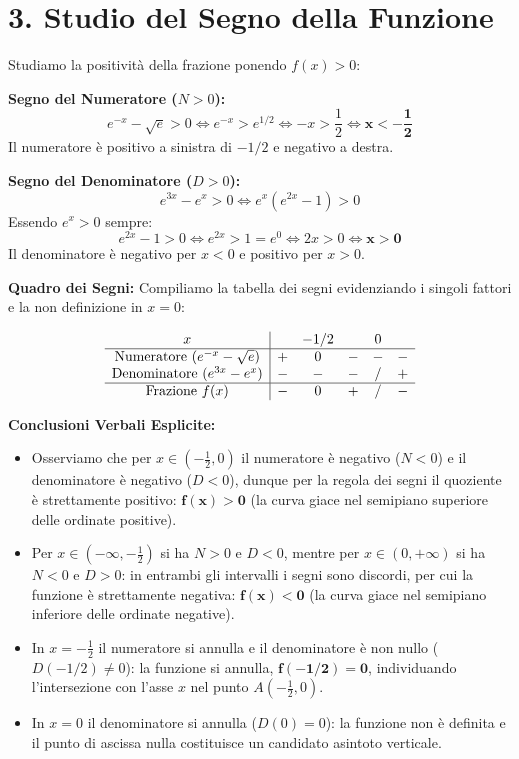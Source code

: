 \documentclass[11pt,a4paper,oneside]{report}
\begin{document}
\section{3. Studio del Segno della Funzione}
Studiamo la positività della frazione ponendo $f(x) > 0$:

\textbf{Segno del Numeratore ($N > 0$):}
\begin{equation*}
    e^{-x} - \sqrt{e} > 0 \iff e^{-x} > e^{1/2} \iff -x > \frac{1}{2} \iff \mathbf{x < -\frac{1}{2}}
\end{equation*}
Il numeratore è positivo a sinistra di $-1/2$ e negativo a destra.

\textbf{Segno del Denominatore ($D > 0$):}
\begin{equation*}
    e^{3x} - e^x > 0 \iff e^x(e^{2x} - 1) > 0
\end{equation*}
Essendo $e^x > 0$ sempre:
\begin{equation*}
    e^{2x} - 1 > 0 \iff e^{2x} > 1 = e^0 \iff 2x > 0 \iff \mathbf{x > 0}
\end{equation*}
Il denominatore è negativo per $x < 0$ e positivo per $x > 0$.

\textbf{Quadro dei Segni:}
Compiliamo la tabella dei segni evidenziando i singoli fattori e la non definizione in $x = 0$:

\[
\begin{array}{c|ccccc}
x & & -1/2 & & 0 & \\
\hline
\text{Numeratore } (e^{-x} - \sqrt{e}) & + & 0 & - & - & - \\
\text{Denominatore } (e^{3x} - e^x) & - & - & - & \text{\slash} & + \\
\hline
\text{Frazione } f(x) & - & 0 & + & \text{\slash} & - \\
\end{array}
\]

\textbf{Conclusioni Verbali Esplicite:}
\begin{itemize}[leftmargin=*, label=\textbullet]
    \item Osserviamo che per $x \in \left(-\frac{1}{2}, 0\right)$ il numeratore è negativo ($N < 0$) e il denominatore è negativo ($D < 0$), dunque per la regola dei segni il quoziente è strettamente positivo: $\mathbf{f(x) > 0}$ (la curva giace nel semipiano superiore delle ordinate positive).
    \item Per $x \in \left(-\infty, -\frac{1}{2}\right)$ si ha $N > 0$ e $D < 0$, mentre per $x \in (0, +\infty)$ si ha $N < 0$ e $D > 0$: in entrambi gli intervalli i segni sono discordi, per cui la funzione è strettamente negativa: $\mathbf{f(x) < 0}$ (la curva giace nel semipiano inferiore delle ordinate negative).
    \item In $x = -\frac{1}{2}$ il numeratore si annulla e il denominatore è non nullo ($D(-1/2) \neq 0$): la funzione si annulla, $\mathbf{f(-1/2) = 0}$, individuando l'intersezione con l'asse $x$ nel punto $A\left(-\frac{1}{2}, 0\right)$.
    \item In $x = 0$ il denominatore si annulla ($D(0) = 0$): la funzione non è definita e il punto di ascissa nulla costituisce un candidato asintoto verticale.
\end{itemize}
\end{document}
